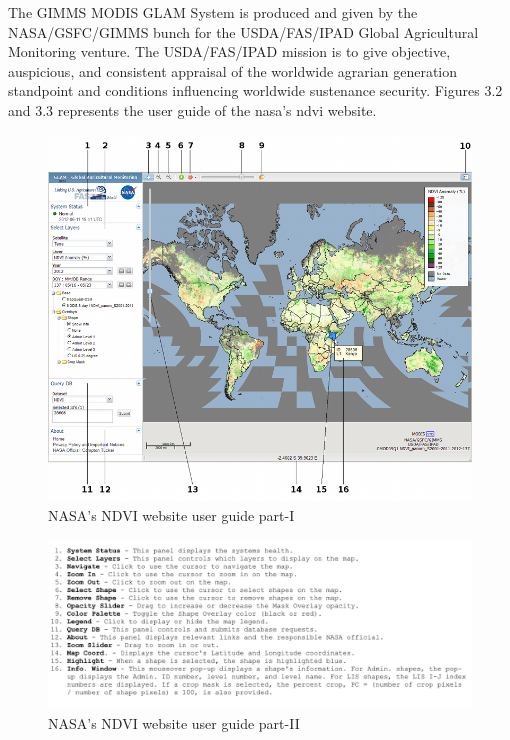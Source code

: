 The GIMMS MODIS GLAM System is produced and given by the NASA/GSFC/GIMMS bunch for the USDA/FAS/IPAD Global Agricultural Monitoring venture. The USDA/FAS/IPAD mission is to give objective, auspicious, and consistent appraisal of the worldwide agrarian generation standpoint and conditions influencing worldwide sustenance security. Figures 3.2 and 3.3 represents the user guide of the \gls{nasa}'s \gls{ndvi} website.

    \begin{figure}[H]
            \centering
            \includegraphics[width=1.0\linewidth]{figures/ch3/nasa_website_1.png}
            \caption{\label{fig:nasa_website_1} NASA's NDVI website user guide part-I \cite{GAM}}
    \end{figure}
    
    
    \begin{figure}[H]
            \centering
            \includegraphics[width=1.0\linewidth]{figures/ch3/nasa_website_2.png}
            \caption{\label{fig:nasa_website_2} NASA's NDVI website user guide part-II \cite{GAM}}
    \end{figure}    


